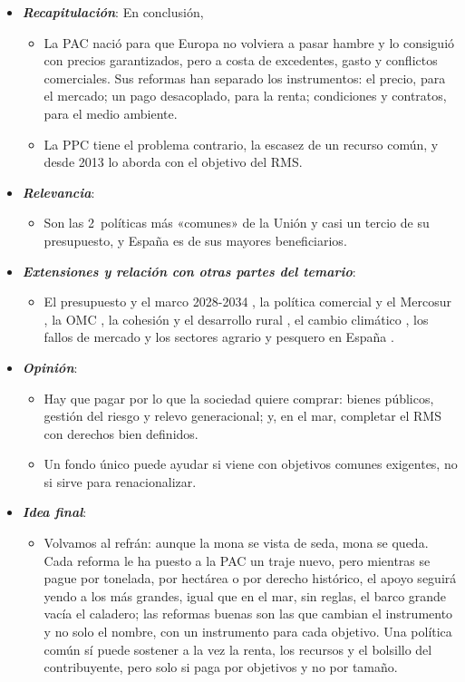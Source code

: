 \documentclass[11pt]{article}
\begin{document}
\begin{itemize}
\item \textbf{\emph{Recapitulación}}: En conclusión,
  \begin{itemize}
  \item La PAC nació para que Europa no volviera a pasar hambre y lo consiguió con precios garantizados, pero a costa de excedentes, gasto y conflictos comerciales. Sus reformas han separado los instrumentos: el precio, para el mercado; un pago desacoplado, para la renta; condiciones y contratos, para el medio ambiente.
  \item La PPC tiene el problema contrario, la escasez de un recurso común, y desde 2013 lo aborda con el objetivo del RMS.
  \end{itemize}
\item \textbf{\emph{Relevancia}}:
  \begin{itemize}
  \item Son las 2~políticas más «comunes» de la Unión y casi un tercio de su presupuesto, y España es de sus mayores beneficiarios.
  \end{itemize}
\item \textbf{\emph{Extensiones y relación con otras partes del temario}}:
  \begin{itemize}
  \item El presupuesto y el marco 2028-2034 , la política comercial y el Mercosur  , la OMC , la cohesión y el desarrollo rural , el cambio climático , los fallos de mercado  y los sectores agrario y pesquero en España .
  \end{itemize}
\item \textbf{\emph{Opinión}}:
  \begin{itemize}
  \item Hay que pagar por lo que la sociedad quiere comprar: bienes públicos, gestión del riesgo y relevo generacional; y, en el mar, completar el RMS con derechos bien definidos.

  \item Un fondo único puede ayudar si viene con objetivos comunes exigentes, no si sirve para renacionalizar.
  \end{itemize}
\item \textbf{\emph{Idea final}}:
  \begin{itemize}
  \item Volvamos al refrán: aunque la mona se vista de seda, mona se queda. Cada reforma le ha puesto a la PAC un traje nuevo, pero mientras se pague por tonelada, por hectárea o por derecho histórico, el apoyo seguirá yendo a los más grandes, igual que en el mar, sin reglas, el barco grande vacía el caladero; las reformas buenas son las que cambian el instrumento y no solo el nombre, con un instrumento para cada objetivo. Una política común sí puede sostener a la vez la renta, los recursos y el bolsillo del contribuyente, pero solo si paga por objetivos y no por tamaño.
  \end{itemize}
\end{itemize}
\end{document}
